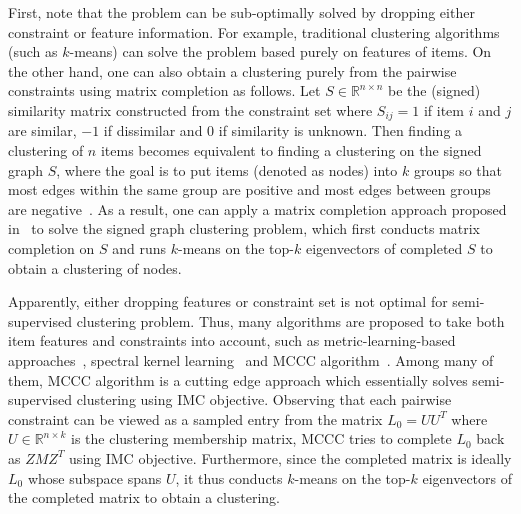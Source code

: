 \documentclass[twoside,11pt]{article}
\def\R{\mathbb{R}}
\def\realL{L_0}
\begin{document}
First, note that the problem can be sub-optimally solved by dropping either
constraint or feature information.
For example, %
traditional clustering algorithms (such as $k$-means) can solve the problem based purely
on features of items.
On the other hand, one can also obtain a clustering purely
from the pairwise constraints using matrix completion as follows.
Let $S\in\R^{n \times n}$ be the (signed) similarity matrix constructed from the constraint set where $S_{ij} = 1$
if item $i$ and $j$ are similar, $-1$ if dissimilar and $0$
if similarity is unknown.
Then finding a clustering of $n$ items becomes equivalent to finding a clustering on the %
signed graph $S$, where the goal is to put items (denoted as nodes)
into $k$ groups so that most edges within the same group
are positive and most edges between groups are negative~\citep{Chiang14a}.
As a result, one can apply
a matrix completion approach proposed in~\citet{Chiang14a} to solve the signed graph
clustering problem, which first conducts matrix completion on $S$ and
runs $k$-means on the top-$k$ eigenvectors of completed $S$ to obtain a clustering of nodes.

Apparently, either dropping features or constraint set
is not optimal for semi-supervised clustering problem.
Thus, many algorithms are proposed to take both item features and constraints into
account, such as metric-learning-based approaches~\citep{Davis07a}, spectral kernel learning~\citep{Li09a} and
MCCC algorithm~\citep{Yi13a}.
Among many of them, MCCC algorithm is a cutting edge approach which
essentially solves semi-supervised clustering using IMC objective.
Observing that each pairwise constraint can be
viewed as a sampled entry from the matrix $\realL = UU^T$ where
$U \in \R^{n\times k}$ is the clustering membership matrix,
MCCC tries to complete $\realL$ back as $ZMZ^T$ using IMC objective.
Furthermore, since the completed matrix is ideally $\realL$ whose subspace spans $U$,
it thus conducts $k$-means on the top-$k$ eigenvectors of the completed matrix to
obtain a clustering.
\end{document}
